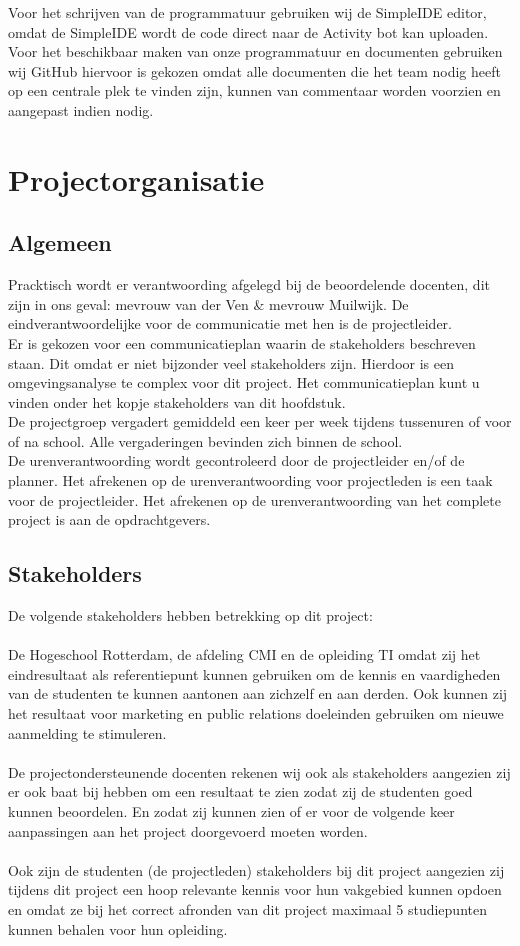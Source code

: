 \documentclass[oneside]{book}
\begin{document}
Voor het schrijven van de programmatuur gebruiken wij de SimpleIDE editor, omdat de SimpleIDE wordt de code direct naar de Activity bot kan uploaden.\\

Voor het beschikbaar maken van onze programmatuur en documenten gebruiken wij GitHub hiervoor is gekozen omdat alle documenten die het team nodig heeft op een centrale plek te vinden zijn, kunnen van commentaar worden voorzien en aangepast indien nodig.\\

\clearpage
\chapter{Projectorganisatie}
\section*{Algemeen}
Pracktisch wordt er verantwoording afgelegd bij de beoordelende docenten, dit zijn in ons geval: mevrouw van der Ven \& mevrouw Muilwijk.
De eindverantwoordelijke voor de communicatie met hen is de projectleider.\\
Er is gekozen voor een communicatieplan waarin de stakeholders beschreven staan.
Dit omdat er niet bijzonder veel stakeholders zijn.
Hierdoor is een omgevingsanalyse te complex voor dit project.
Het communicatieplan kunt u vinden onder het kopje stakeholders van dit hoofdstuk.\\
De projectgroep vergadert gemiddeld een keer per week tijdens tussenuren of voor of na school.
Alle vergaderingen bevinden zich binnen de school.\\
De urenverantwoording wordt gecontroleerd door de projectleider en/of de planner.
Het afrekenen op de urenverantwoording voor projectleden is een taak voor de projectleider.
Het afrekenen op de urenverantwoording van het complete project is aan de opdrachtgevers.
\section*{Stakeholders}
De volgende stakeholders hebben betrekking op dit project:\\
\\
De Hogeschool Rotterdam, de afdeling CMI en de opleiding TI omdat zij het eindresultaat als
referentiepunt kunnen gebruiken om de kennis en vaardigheden van de studenten te kunnen
aantonen aan zichzelf en aan derden.
Ook kunnen zij het resultaat voor marketing en public relations doeleinden gebruiken om nieuwe
aanmelding te stimuleren.\\
\\
De projectondersteunende docenten rekenen wij ook als stakeholders aangezien zij er ook baat bij hebben om een resultaat te zien zodat zij de studenten goed kunnen beoordelen.
En zodat zij kunnen zien of er voor de volgende keer aanpassingen aan het project doorgevoerd
moeten worden.\\
\\
Ook zijn de studenten (de projectleden) stakeholders bij dit project aangezien zij tijdens dit project
een hoop relevante kennis voor hun vakgebied kunnen opdoen en omdat ze bij het correct afronden
van dit project maximaal 5 studiepunten kunnen behalen voor hun opleiding.
\clearpage
\end{document}
